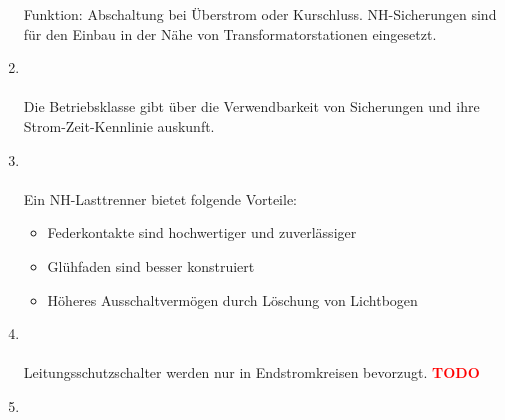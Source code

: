 \begin{enumerate}
            Funktion: Abschaltung bei Überstrom oder Kurschluss. NH-Sicherungen sind für den Einbau in der Nähe von Transformatorstationen 
            eingesetzt.

    \item   {} \\\\
            Die Betriebsklasse gibt über die Verwendbarkeit von Sicherungen und ihre Strom-Zeit-Kennlinie auskunft.

    \item   {} \\\\
            Ein NH-Lasttrenner bietet folgende Vorteile:
            \begin{itemize}
                \item Federkontakte sind hochwertiger und zuverlässiger
                \item Glühfaden sind besser konstruiert
                \item Höheres Ausschaltvermögen durch Löschung von Lichtbogen
            \end{itemize}      

    \item   {}\\\\
            Leitungsschutzschalter werden nur in Endstromkreisen bevorzugt.
            \textbf{\textcolor{red}{TODO}}

    \clearpage


    \item   {}\\\\


\end{enumerate}
